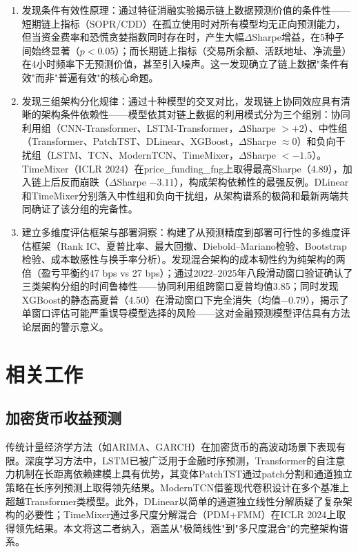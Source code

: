 \documentclass[12pt,a4paper]{ctexart}
\begin{document}
\begin{enumerate}[label=(\arabic*),leftmargin=2.5em]
    \item 发现条件有效性原理：通过特征消融实验揭示链上数据预测价值的条件性——短期链上指标（SOPR/CDD）在孤立使用时对所有模型均无正向预测能力，但当资金费率和恐慌贪婪指数同时存在时，产生大幅$\Delta$Sharpe增益，在5种子间始终显著（$p<0.05$）；而长期链上指标（交易所余额、活跃地址、净流量）在4小时频率下无预测价值，甚至引入噪声。这一发现确立了链上数据"条件有效"而非"普遍有效"的核心命题。
    \item 发现三组架构分化规律：通过十种模型的交叉对比，发现链上协同效应具有清晰的架构条件依赖性——模型依其对链上数据的利用模式分为三个组别：协同利用组（CNN-Transformer、LSTM-Transformer，$\Delta$Sharpe $>+2$）、中性组（Transformer、PatchTST、DLinear、XGBoost，$\Delta$Sharpe $\approx 0$）和负向干扰组（LSTM、TCN、ModernTCN、TimeMixer，$\Delta$Sharpe $< -1.5$）。TimeMixer（ICLR 2024）在price\_funding\_fng上取得最高Sharpe（4.89），加入链上后反而崩跌（$\Delta$Sharpe $-3.11$），构成架构依赖性的最强反例。DLinear和TimeMixer分别落入中性组和负向干扰组，从架构谱系的极简和最新两端共同确证了该分组的完备性。
    \item 建立多维度评估框架与部署洞察：构建了从预测精度到部署可行性的多维度评估框架（Rank IC、夏普比率、最大回撤、Diebold--Mariano检验、Bootstrap检验、成本敏感性与换手率分析）。发现混合架构的成本韧性约为纯架构的两倍（盈亏平衡约47 bps vs 27 bps）；通过2022--2025年八段滑动窗口验证确认了三类架构分组的时间鲁棒性——协同利用组跨窗口夏普均值3.85；同时发现XGBoost的静态高夏普（4.50）在滑动窗口下完全消失（均值$-0.79$），揭示了单窗口评估可能严重误导模型选择的风险——这对金融预测模型评估具有方法论层面的警示意义。
\end{enumerate}

\section{相关工作}

\subsection{加密货币收益预测}

传统计量经济学方法（如ARIMA、GARCH）在加密货币的高波动场景下表现有限\cite{catania2019,kristoufek2015}。深度学习方法中，LSTM\cite{hochreiter1997}已被广泛用于金融时序预测\cite{mcnally2018}，Transformer的自注意力机制在长距离依赖建模上具有优势\cite{lim2021,wen2023}，其变体PatchTST\cite{nie2023}通过patch分割和通道独立策略在长序列预测上取得领先结果。ModernTCN\cite{luo2024}借鉴现代卷积设计在多个基准上超越Transformer类模型。此外，DLinear\cite{zeng2023}以简单的通道独立线性分解质疑了复杂架构的必要性；TimeMixer\cite{wang2024timemixer}通过多尺度分解混合（PDM+FMM）在ICLR 2024上取得领先结果。本文将这二者纳入，涵盖从"极简线性"到"多尺度混合"的完整架构谱系。
\end{document}
